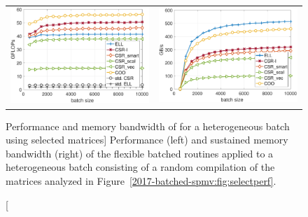 \begin{figure}[t]
	\begin{center}
		\begin{tabular}{cc}
			\includegraphics[width=.45\columnwidth]{plots/RND_UNITSIZE_GFLOPS}
			&
			\includegraphics[width=.45\columnwidth]{plots/RND_UNITSIZE_BW}\\
		\end{tabular}
	\end{center}
	\caption
    [Performance and memory bandwidth of \spmv for a heterogeneous batch using
    selected matrices]
    {Performance (left) and sustained memory bandwidth (right) of the 
		flexible batched \spmv routines
		applied to a heterogeneous batch consisting of a random compilation of 
		the 
		matrices analyzed in Figure~\ref{2017-batched-spmv:fig:selectperf}.
	}
	\label{2017-batched-spmv:fig:similarsize}
\end{figure}

